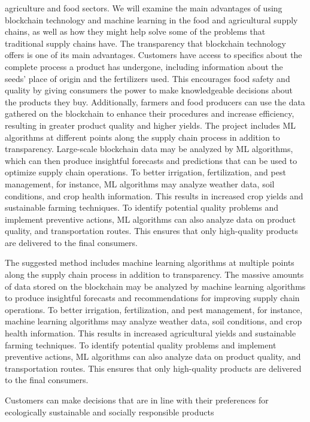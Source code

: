 agriculture and food sectors. We will examine the main advantages of using blockchain technology and machine learning in the 
food and agricultural supply chains, as well as how they might help solve some of the problems that traditional supply chains have.
The transparency that blockchain technology offers is one of its main advantages. Customers have access to specifics about the 
complete process a product has undergone, including information about the seeds' place of origin and the fertilizers used. This 
encourages food safety and quality by giving consumers the power to make knowledgeable decisions about the products they buy. 
Additionally, farmers and food producers can use the data gathered on the blockchain to enhance their procedures and increase
efficiency, resulting in greater product quality and higher yields. The project includes ML algorithms at different points along the 
supply chain process in addition to transparency. Large-scale blockchain data may be analyzed by ML algorithms, which can then 
produce insightful forecasts and predictions that can be used to optimize supply chain operations. To better irrigation, fertilization, 
and pest management, for instance, ML algorithms may analyze weather data, soil conditions, and crop health information. This 
results in increased crop yields and sustainable farming techniques. To identify potential quality problems and implement preventive 
actions, ML algorithms can also analyze data on product quality, and transportation routes. This ensures that only high-quality 
products are delivered to the final consumers.
\par The suggested method includes machine learning algorithms at multiple points along the supply chain process in addition to 
transparency. The massive amounts of data stored on the blockchain may be analyzed by machine learning algorithms to produce 
insightful forecasts and recommendations for improving supply chain operations. To better irrigation, fertilization, and pest 
management, for instance, machine learning algorithms may analyze weather data, soil conditions, and crop health information. 
This results in increased agricultural yields and sustainable farming techniques. To identify potential quality problems and 
implement preventive actions, ML algorithms can also analyze data on product quality, and transportation routes. This ensures that 
only high-quality products are delivered to the final consumers.
\par Customers can make decisions that are in line with their preferences for ecologically sustainable and socially responsible products 
